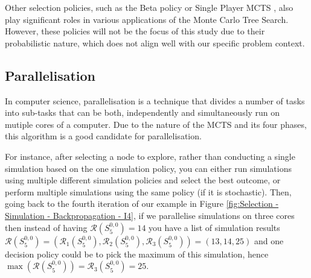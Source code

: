 \documentclass[conference]{IEEEtran}
\begin{document}
Other selection policies, such as the Beta policy or Single Player MCTS \cite{different_selection_policies}, also play significant roles in various applications of the Monte Carlo Tree Search. However, these policies will not be the focus of this study due to their probabilistic nature, which does not align well with our specific problem context.


\subsection{Parallelisation}
\label{sub:parralelisation}

In computer science, parallelisation is a technique that divides a number of tasks into sub-tasks that can be both, independently and simultaneously run on mutiple cores of a computer.
Due to the nature of the MCTS and its four phases, this algorithm is a good candidate for parallelisation.

For instance, after selecting a node to explore, rather than conducting a single simulation based on the one simulation policy, you can either run simulations using multiple different simulation policies and select the best outcome, or perform multiple simulations using the same policy (if it is stochastic). 
Then, going back to the fourth iteration of our example in Figure \ref{fig:Selection - Simulation - Backpropagation - I4}, if we parallelise simulations on three cores then instead of having $\mathcal{R}(S^{0,0}_{5})=14$ you have a list of simulation results $\mathcal{R}(S^{0,0}_{5})=(\mathcal{R}_1(S^{0,0}_{5}),\mathcal{R}_2(S^{0,0}_{5}),\mathcal{R}_3(S^{0,0}_{5}))=(13,14,25)$ and one decision policy could be to pick the maximum of this simulation, hence $\max(\mathcal{R}(S^{0,0}_{5}))=\mathcal{R}_3(S^{0,0}_{5})=25$.
\end{document}
